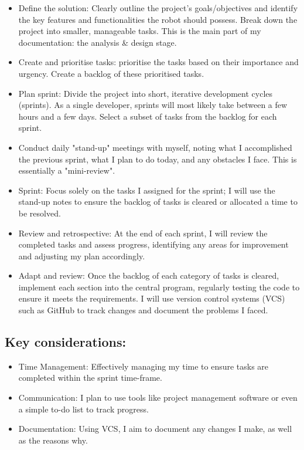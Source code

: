 \begin{itemize}
    \item Define the solution: 
        Clearly outline the project's goals/objectives and identify the key features and functionalities the robot should possess. Break down the project into smaller, manageable tasks. This is the main part of my documentation: the analysis \& design stage.
    \item Create and prioritise tasks: prioritise the tasks based on their importance and urgency. Create a backlog of these prioritised tasks.

    \item Plan sprint: Divide the project into short, iterative development cycles (sprints). As a single developer, sprints will most likely take between a few hours and a few days. Select a subset of tasks from the backlog for each sprint.

    \item Conduct daily "stand-up" meetings with myself, noting what I accomplished the previous sprint, what I plan to do today, and any obstacles I face. This is essentially a "mini-review".

    \item Sprint: Focus solely on the tasks I assigned for the sprint; I will use the stand-up notes to ensure the backlog of tasks is cleared or allocated a time to be resolved.

    \item Review and retrospective: At the end of each sprint, I will review the completed tasks and assess progress, identifying any areas for improvement and adjusting my plan accordingly.

    \item Adapt and review: Once the backlog of each category of tasks is cleared, implement each section into the central program, regularly testing the code to ensure it meets the requirements. I will use version control systems (VCS) such as GitHub to track changes and document the problems I faced.
\end{itemize}

\subsection{Key considerations:}
\begin{itemize}
    \item Time Management: Effectively managing my time to ensure tasks are completed within the sprint time-frame.
    \item Communication: I plan to use tools like project management software or even a simple to-do list to track progress.
    \item Documentation: Using VCS, I aim to document any changes I make, as well as the reasons why.
\end{itemize}